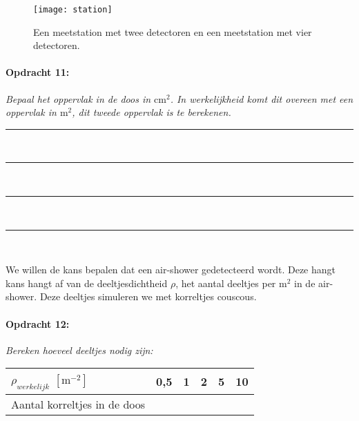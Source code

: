 \begin{figure}[p]
    \centering
    \texttt{[image: station]}
    \caption{Een meetstation met twee detectoren en een
    meetstation met vier detectoren.}
    \label{fig:Meetstations}
\end{figure}

\begin{minipage}[t]{\columnwidth}%

\paragraph{Opdracht 11:}

\textit{Bepaal het oppervlak in de doos in $\mathrm{cm^{2}}$. In
werkelijkheid komt dit overeen met een oppervlak in $\mathrm{m^{2}}$,
dit tweede oppervlak is te berekenen.}

\begin{center}
    \rule{\textwidth}{0.3mm}\\
    \rule{\textwidth}{0.3mm}\\
    \rule{\textwidth}{0.3mm}\\
    \rule{\textwidth}{0.3mm}\\
\end{center}
\end{minipage}\bigskip{}

We willen de kans bepalen dat een air-shower gedetecteerd wordt. Deze
hangt kans hangt af van de deeltjesdichtheid $\rho$, het aantal deeltjes
per $\mathrm{m^{2}}$ in de air-shower. Deze deeltjes simuleren we
met korreltjes couscous.

\begin{minipage}[t]{1\columnwidth}%

\paragraph{Opdracht 12:}

\textit{Bereken hoeveel deeltjes nodig zijn:}

\bigskip{}

\begin{tabular}{|x{.3\textwidth}|x{.1\textwidth}|x{.1\textwidth}
                |x{.1\textwidth}|x{.1\textwidth}|x{.1\textwidth}|}
    \hline 
    $\rho_{werkelijk}$ $\left[\mathrm{m^{-2}}\right]$ & 0,5 & 1 & 2 & 5 & 10 \\
    \hline 
    Aantal korreltjes in de doos &  &  &  &  & \\
    \hline 
    \end{tabular}%
\end{minipage}

